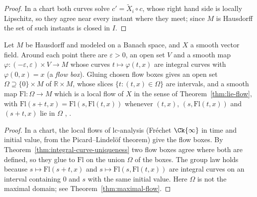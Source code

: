 \begin{proof}
  \leanok
  In a chart both curves solve $c' = \tilde X_i \circ c$, whose right hand side is locally
  Lipschitz, so they agree near every instant where they meet; since $M$ is Hausdorff the set of
  such instants is closed in $I$.
\end{proof}

\begin{theorem}
  \label{thm:banach-local-flow-manifold}
  \leanok
  Let $M$ be Hausdorff and modeled on a Banach space, and $X$ a smooth vector field. Around each
  point there are $\varepsilon > 0$, an open set $V$ and a smooth map
  $\varphi \colon (-\varepsilon, \varepsilon) \times V \to M$ whose curves $t \mapsto \varphi(t, x)$
  are integral curves with $\varphi(0, x) = x$ (a \emph{flow box}). Gluing chosen flow boxes gives
  an open set $\Omega \supseteq \{0\} \times M$ of $\mathbb{R} \times M$, whose slices
  $\{t : (t, x) \in \Omega\}$ are intervals, and a smooth map $\mathrm{Fl} \colon \Omega \to M$
  which is a local flow of $X$ in the sense of Theorem~\ref{thm:lie-flow}, with
  $\mathrm{Fl}(s + t, x) = \mathrm{Fl}(s, \mathrm{Fl}(t, x))$ whenever $(t, x)$,
  $(s, \mathrm{Fl}(t, x))$ and $(s + t, x)$ lie in $\Omega$
  \cite[Corollary~2.5.21]{GN26}, \cite[Theorem~IV.2.2]{Lan99}.
\end{theorem}

\begin{proof}
  \leanok
  In a chart, the local flows of lc-analysis (Fr\'echet $\Ck{\infty}$ in time and initial value,
  from the Picard--Lindel\"of theorem) give the flow boxes. By
  Theorem~\ref{thm:integral-curve-uniqueness} two flow boxes agree where both are defined, so they
  glue to $\mathrm{Fl}$ on the union $\Omega$ of the boxes. The group law holds because
  $s \mapsto \mathrm{Fl}(s + t, x)$ and $s \mapsto \mathrm{Fl}(s, \mathrm{Fl}(t, x))$ are integral
  curves on an interval containing $0$ and $s$ with the same initial value. Here $\Omega$ is not
  the maximal domain; see Theorem~\ref{thm:maximal-flow}.
\end{proof}

